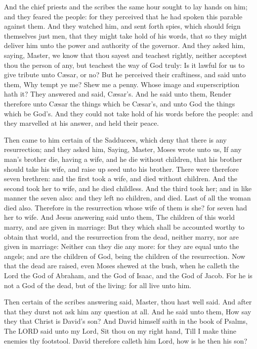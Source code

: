  And the chief priests and the scribes the same hour
sought to lay hands on him; and they feared the people: for they
perceived that he had spoken this parable against them. 
And they watched him, and sent forth spies, which should feign
themselves just men, that they might take hold of his words, that so
they might deliver him unto the power and authority of the governor.
 And they asked him, saying, Master, we know that thou
sayest and teachest rightly, neither acceptest thou the person of any,
but teachest the way of God truly:  Is it lawful for us to
give tribute unto Cæsar, or no?  But he perceived their
craftiness, and said unto them, Why tempt ye me?  Shew me a
penny. Whose image and superscription hath it? They answered and said,
Cæsar's.  And he said unto them, Render therefore unto
Cæsar the things which be Cæsar's, and unto God the things which be
God's.  And they could not take hold of his words before
the people: and they marvelled at his answer, and held their peace.

 Then came to him certain of the Sadducees, which deny
that there is any resurrection; and they asked him, 
Saying, Master, Moses wrote unto us, If any man's brother die, having a
wife, and he die without children, that his brother should take his
wife, and raise up seed unto his brother.  There were
therefore seven brethren: and the first took a wife, and died without
children.  And the second took her to wife, and he died
childless.  And the third took her; and in like manner the
seven also: and they left no children, and died.  Last of
all the woman died also.  Therefore in the resurrection
whose wife of them is she? for seven had her to wife.  And
Jesus answering said unto them, The children of this world marry, and
are given in marriage:  But they which shall be accounted
worthy to obtain that world, and the resurrection from the dead, neither
marry, nor are given in marriage:  Neither can they die any
more: for they are equal unto the angels; and are the children of God,
being the children of the resurrection.  Now that the dead
are raised, even Moses shewed at the bush, when he calleth the Lord the
God of Abraham, and the God of Isaac, and the God of Jacob.
 For he is not a God of the dead, but of the living: for
all live unto him.

 Then certain of the scribes answering said, Master, thou
hast well said.  And after that they durst not ask him any
question at all.  And he said unto them, How say they that
Christ is David's son?  And David himself saith in the book
of Psalms, The LORD said unto my Lord, Sit thou on my right hand,
 Till I make thine enemies thy footstool. 
David therefore calleth him Lord, how is he then his son?

